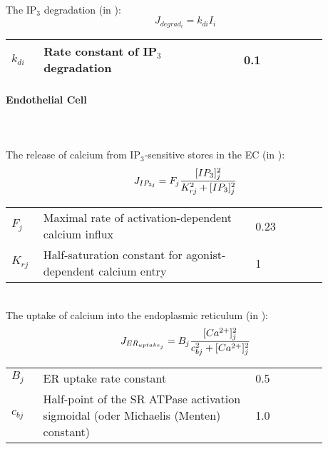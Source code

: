 \\
The IP$_{3}$ degradation (in \uMs): 
\begin{equation} \label{eq:Jdegradi}
J_{degrad_{i}}= k_{di}I_{i}
\end{equation}
\begin{table}[h!]
\centering
\begin{tabular}{| p{0.09\linewidth} | >{\footnotesize} p{0.57\linewidth} | >{\footnotesize} p{0.2\linewidth} | >{\footnotesize} p{0.02\linewidth} |}
\arrayrulecolor{lightgrey}\hline
$k_{di}$      			& Rate constant of IP$_{3}$ degradation	& 0.1 \pers	&\cite{Koenigsberger2006} \\
\hline
\end{tabular}
\label{tab:Jdegradi}
\end{table}
%
\newpage
\paragraph{Endothelial Cell}~\\
\\
%
The release of calcium from IP$_{3}$-sensitive stores in the EC (in \uMps):
\begin{equation} \label{eq:JIP3j}
J_{IP_{3j}} = F_{j}\frac{[IP_{3}]_{j}^{2}}{K_{rj}^{2}+[IP_{3}]_{j}^{2}}
\end{equation}
\begin{table}[h!]
\centering
\begin{tabular}{| p{0.09\linewidth} | >{\footnotesize} p{0.6\linewidth} | >{\footnotesize} p{0.17\linewidth} | >{\footnotesize} p{0.02\linewidth} |}
\arrayrulecolor{lightgrey}\hline
 $F_{j}$      			& Maximal rate of activation-dependent calcium influx			& 0.23 \uMps				& \cite{Koenigsberger2006} \\
$K_{rj}$				& Half-saturation constant for agonist-dependent calcium entry	& 1 \uM					& \cite{Koenigsberger2006} \\
\hline
\end{tabular}
\label{tab:IP3j}
\end{table}
\\
%
The uptake of calcium into the endoplasmic reticulum (in \uMs):
\begin{equation} \label{eq:JERuptakej}
J_{ER_{uptake_{j}}} = B_{j}\frac{[Ca^{2+}]_{j}^{2}}{c_{bj}^{2}+[Ca^{2+}]_{j}^{2}}
\end{equation}
%
\begin{table}[h!]
\centering
\begin{tabular}{| p{0.09\linewidth} | >{\footnotesize} p{0.6\linewidth} | >{\footnotesize} p{0.17\linewidth} | >{\footnotesize} p{0.02\linewidth} |}
\arrayrulecolor{lightgrey}\hline
$B_{j}$      			& ER uptake rate constant							& 0.5 \uMs				& \cite{Koenigsberger2006} \\
$c_{bj}$				& Half-point of the SR ATPase activation sigmoidal (oder Michaelis (Menten) constant) 	& 1.0 \uM					& \cite{Koenigsberger2006} \\
\hline
\end{tabular}
\label{tab:JERuptakej}
\end{table}
